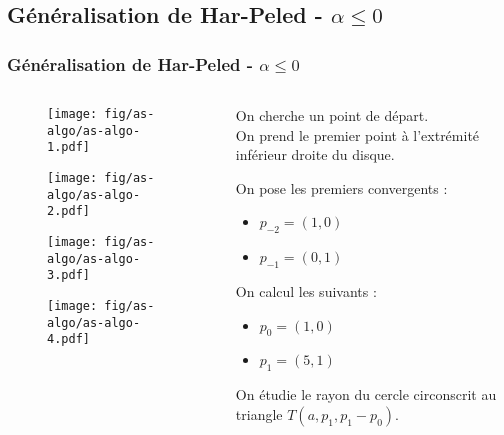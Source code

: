 \documentclass{beamer}
\begin{document}
\subsection{Généralisation de Har-Peled - $\alpha \leq 0$}
\begin{frame}
\frametitle{Généralisation de Har-Peled - $\alpha \leq 0$}
  
  \begin{columns}[t]
  \begin{column}{7cm}
      {
        \begin{figure}[h!]
          \centering
          \texttt{[image: fig/as-algo/as-algo-1.pdf]}
      \end{figure}
      }
      {
        \begin{figure}[h!]
          \centering
          \texttt{[image: fig/as-algo/as-algo-2.pdf]}
      \end{figure}
      }
      {
        \begin{figure}[h!]
          \centering
          \texttt{[image: fig/as-algo/as-algo-3.pdf]}
      \end{figure}
      }
      {
        \begin{figure}[h!]
          \centering
          \texttt{[image: fig/as-algo/as-algo-4.pdf]}
      \end{figure}
      }
    \end{column}
    \begin{column}{3cm}
      \begin{block}{}
        {
          On cherche un point de départ.
          \\ On prend le premier point à l'extrémité inférieur droite du disque.
        }
        {
          On pose les premiers convergents :\\
          \begin{itemize}
            \item $p_{-2} = (1, 0)$
            \item $p_{-1} = (0, 1)$
          \end{itemize}            
        }
        {
          On calcul les suivants :\\
          \begin{itemize}
            \item $p_{0} = (1, 0)$
            \item $p_{1} = (5, 1)$
          \end{itemize}            
        }
        {
          On étudie le rayon du cercle circonscrit au triangle $T(a, p_{1}, p_{1}-p_{0})$.
        }
      \end{block}     
    \end{column}
  \end{columns} 

\end{frame}
\end{document}
